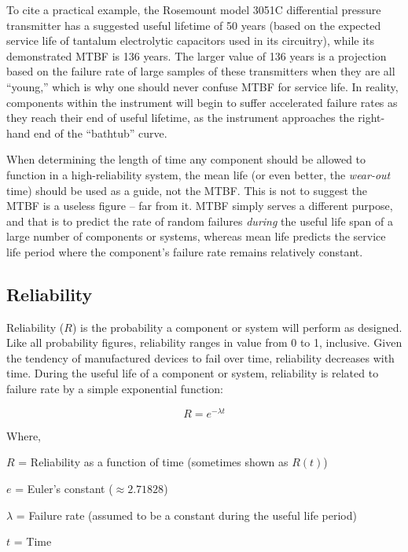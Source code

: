 To cite a practical example, the Rosemount model 3051C differential pressure transmitter has a suggested useful lifetime of 50 years (based on the expected service life of tantalum electrolytic capacitors used in its circuitry), while its demonstrated MTBF is 136 years.  The larger value of 136 years is a projection based on the failure rate of large samples of these transmitters when they are all ``young,'' which is why one should never confuse MTBF for service life.  In reality, components within the instrument will begin to suffer accelerated failure rates as they reach their end of useful lifetime, as the instrument approaches the right-hand end of the ``bathtub'' curve.

When determining the length of time any component should be allowed to function in a high-reliability system, the mean life (or even better, the \textit{wear-out} time) should be used as a guide, not the MTBF.  This is not to suggest the MTBF is a useless figure -- far from it.  MTBF simply serves a different purpose, and that is to predict the rate of random failures \textit{during} the useful life span of a large number of components or systems, whereas mean life predicts the service life period where the component's failure rate remains relatively constant.  








\filbreak
\subsection{Reliability}

Reliability ($R$) is the probability a component or system will perform as designed.  Like all probability figures, reliability ranges in value from 0 to 1, inclusive.  Given the tendency of manufactured devices to fail over time, reliability decreases with time.  During the useful life of a component or system, reliability is related to failure rate by a simple exponential function:  

$$R = e^{-\lambda t}$$

\noindent
Where,

$R$ = Reliability as a function of time (sometimes shown as $R(t)$)

$e$ = Euler's constant ($\approx 2.71828$)

$\lambda$ = Failure rate (assumed to be a constant during the useful life period)

$t$ = Time

